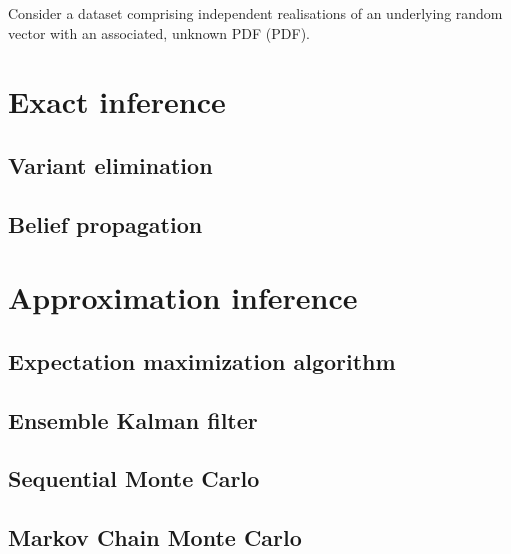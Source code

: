 Consider a dataset  
comprising independent realisations of an underlying random vector with an associated, unknown \acrlong{PDF} (\acrshort{PDF}).

 




\section{Exact inference}
\subsection{Variant elimination}
\subsection{Belief propagation}

\section{Approximation inference}

\subsection{Expectation maximization algorithm}

\subsection{Ensemble Kalman filter}
\subsection{Sequential Monte Carlo}
\subsection{Markov Chain Monte Carlo}

